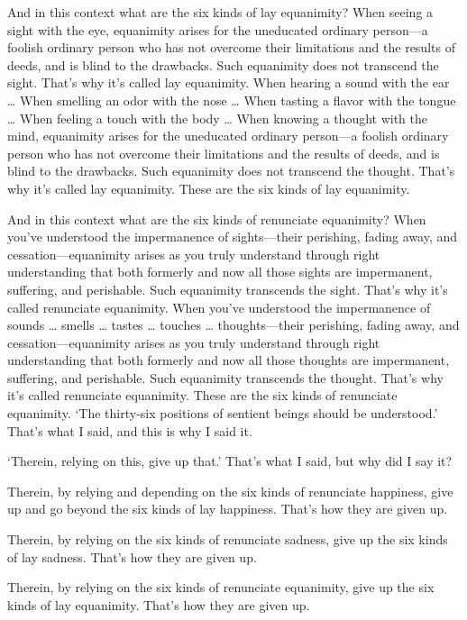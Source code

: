 \documentclass[12pt,openany]{book}%
\begin{document}
And in this context what are the six kinds of lay equanimity? When seeing a sight with the eye, equanimity arises for the uneducated ordinary person—a foolish ordinary person who has not overcome their limitations and the results of deeds, and is blind to the drawbacks. Such equanimity does not transcend the sight. That’s why it’s called lay equanimity. When hearing a sound with the ear … When smelling an odor with the nose … When tasting a flavor with the tongue … When feeling a touch with the body … When knowing a thought with the mind, equanimity arises for the uneducated ordinary person—a foolish ordinary person who has not overcome their limitations and the results of deeds, and is blind to the drawbacks. Such equanimity does not transcend the thought. That’s why it’s called lay equanimity. These are the six kinds of lay equanimity. 

And in this context what are the six kinds of renunciate equanimity? When you’ve understood the impermanence of sights—their perishing, fading away, and cessation—equanimity arises as you truly understand through right understanding that both formerly and now all those sights are impermanent, suffering, and perishable. Such equanimity transcends the sight. That’s why it’s called renunciate equanimity. When you’ve understood the impermanence of sounds … smells … tastes … touches … thoughts—their perishing, fading away, and cessation—equanimity arises as you truly understand through right understanding that both formerly and now all those thoughts are impermanent, suffering, and perishable. Such equanimity transcends the thought. That’s why it’s called renunciate equanimity. These are the six kinds of renunciate equanimity. ‘The thirty-six positions of sentient beings should be understood.’ That’s what I said, and this is why I said it. 

‘Therein, relying on this, give up that.’ That’s what I said, but why did I say it? 

Therein, by relying and depending on the six kinds of renunciate happiness, give up and go beyond the six kinds of lay happiness. That’s how they are given up. 

Therein, by relying on the six kinds of renunciate sadness, give up the six kinds of lay sadness. That’s how they are given up. 

Therein, by relying on the six kinds of renunciate equanimity, give up the six kinds of lay equanimity. That’s how they are given up. 
\end{document}
